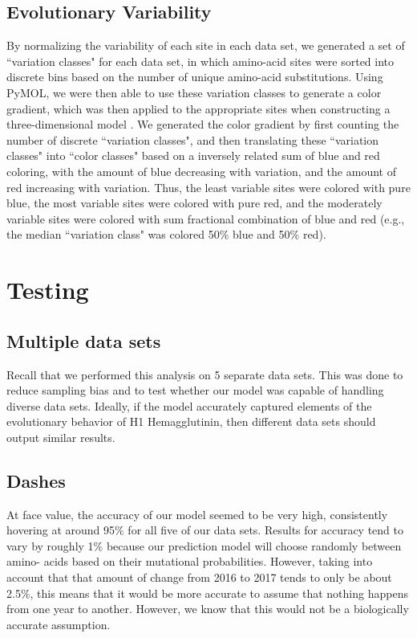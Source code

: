 \documentclass[12pt]{article}
\begin{document}
\begin{multicols}{2}
\subsection{Evolutionary Variability}
By normalizing the variability of each site in each data set, we generated a set of ``variation classes" for each data set, in which amino-acid sites were sorted into discrete bins based on the number of unique amino-acid substitutions. Using PyMOL, we were then able to use these variation classes to generate a color gradient, which was then applied to the appropriate sites when constructing a three-dimensional model \citep{delano2002pymol}. We generated the color gradient by first counting the number of discrete ``variation classes", and then translating these ``variation classes" into ``color classes" based on a inversely related sum of blue and red coloring, with the amount of blue decreasing with variation, and the amount of red increasing with variation. Thus, the least variable sites were colored with pure blue, the most variable sites were colored with pure red, and the moderately variable sites were colored with sum fractional combination of blue and red (e.g., the median ``variation class" was colored 50\% blue and 50\% red).

\section{Testing}
\subsection{Multiple data sets}
Recall that we performed this analysis on 5 separate data sets. This was done to reduce sampling bias and to test whether our model was capable of handling diverse data sets. Ideally, if the model accurately captured elements of the evolutionary behavior of H1 Hemagglutinin, then different data sets should output similar results.

\subsection{Dashes}
At face value, the accuracy of our model seemed to be very high, consistently hovering at around 95\% for all five of our data sets. Results for accuracy tend to vary by roughly 1\% because our prediction model will choose randomly between amino- acids based on their mutational probabilities. However, taking into account that that amount of change from 2016 to 2017 tends to only be about 2.5\%, this means that it would be more accurate to assume that nothing happens from one year to another. However, we know that this would not be a biologically accurate assumption.


\end{multicols}
\end{document}
